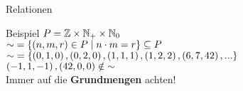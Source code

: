 \begin{frame}{Relationen}	
	\begin{block}{Beispiel}
		$ P = \mathbb{Z} \times \mathbb{N}_+ \times \mathbb{N}_0 $ \\
		$ \text{$\sim$} = \left\{\left(n, m, r\right) \in P \;\middle|\; n \cdot m = r \right\} \subseteq P $ \\[0.5em]
		\pause
		$ \text{$\sim$} = \left\{\left(0, 1, 0\right), \left(0, 2, 0\right), \left(1, 1, 1\right), \left(1, 2, 2\right), \left(6, 7, 42\right), ...\right\} $ \\[0.5em]
		$ \left(-1, 1, -1\right), \left(42, 0, 0\right) \notin \text{$\sim$} $\\[1em]
		\pause
		\impl Immer auf die \textbf{Grundmengen} achten!
	\end{block}
\end{frame}